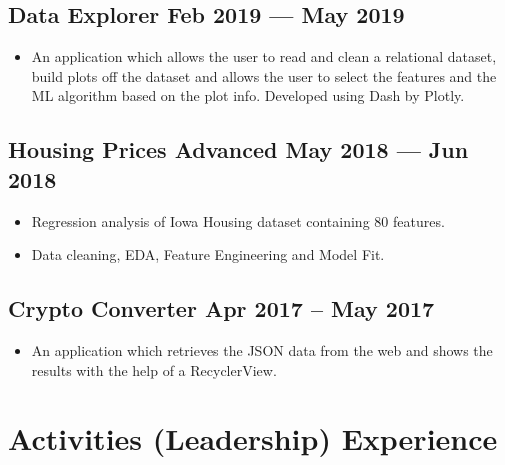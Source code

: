 \documentclass[a4,10pt]{article}
\newenvironment{zitemize}{
\begin{itemize}\itemsep0pt \parskip0pt \parsep1pt}
{\end{itemize}\vspace{-0.5cm}}
\begin{document}
\subsection*{Data Explorer \hfill Feb 2019 --- May 2019} 
    \begin{zitemize}
        \item An application which allows the user to read and clean a relational dataset, build plots off the dataset and allows the user to select the features and the ML algorithm based on the plot info. Developed using Dash by Plotly.
    \end{zitemize}


\subsection*{Housing Prices Advanced \hfill May 2018 --- Jun 2018} 
    \begin{zitemize}
        \item Regression analysis of Iowa Housing dataset containing 80 features. 
        \item Data cleaning, EDA, Feature Engineering and Model Fit. 
    \end{zitemize}


\subsection*{Crypto Converter \hfill Apr 2017 – May 2017} 
    \begin{zitemize}
        \item An application which retrieves the JSON data from the web and shows the results with the help of a RecyclerView.
    \end{zitemize}



\section{Activities (Leadership) Experience}
\end{document}
